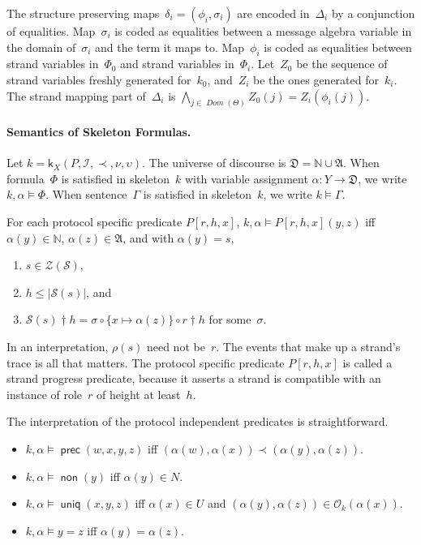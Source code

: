 \documentclass[12pt]{article}
\newcommand{\cn}[1]{\ensuremath{\operatorname{\mathsf{#1}}}}
\newcommand{\fn}[1]{\ensuremath{\operatorname{\mathit{#1}}}}
\newcommand{\sdom}{\fn{Dom}}
\newcommand{\prefix}[2]{#1\dagger#2}
\newcommand{\nat}{\ensuremath{\mathbb{N}}}
\newcommand{\alg}[1]{\ensuremath{\mathfrak{#1}}}
\newcommand{\msg}{\alg{A}}
\newcommand{\ssp}{\ensuremath{\mathcal{S}}}
\newcommand{\strands}{\ensuremath{\mathcal{Z}}}
\newcommand{\rl}{\ensuremath{\rho}}
\newcommand{\skel}{\mathsf{k}}
\newcommand{\insts}{\mathcal{I}}
\newcommand{\orig}{\mathcal{O}}
\begin{document}
The structure preserving maps~$\delta_i=(\phi_i,\sigma_i)$ are encoded
in~$\Delta_i$ by a conjunction of equalities.  Map~$\sigma_i$ is coded
as equalities between a message algebra variable in the domain
of~$\sigma_i$ and the term it maps to.  Map~$\phi_i$ is coded as
equalities between strand variables in~$\Phi_0$ and strand variables
in~$\Phi_i$.  Let~$Z_0$ be the sequence of strand variables freshly
generated for~$k_0$, and~$Z_i$ be the ones generated for~$k_i$.  The
strand mapping part of~$\Delta_i$ is
$\bigwedge_{j\in\sdom(\Theta)}Z_0(j)=Z_i(\phi_i(j))$.

\paragraph{Semantics of Skeleton Formulas.}

Let $k=\skel_X(P,\insts,\prec,\nu,\upsilon)$.  The universe of discourse is
$\alg{D}=\nat\cup\msg$.  When formula~$\Phi$ is satisfied in
skeleton~$k$ with variable assignment $\alpha\colon Y\to \alg{D}$, we
write $k,\alpha\models\Phi$.  When sentence~$\Gamma$ is satisfied in
skeleton~$k$, we write $k\models\Gamma$.

For each protocol specific predicate $P[r,h,x]$, $k,\alpha\models
P[r,h,x](y,z)$ iff $\alpha(y)\in\nat$, $\alpha(z)\in\msg$, and with
$\alpha(y)=s$,

\begin{enumerate}
\item $s\in\strands(\ssp)$,
\item $h\leq|\ssp(s)|$, and
\item $\prefix{\ssp(s)}{h}=\sigma\circ\{x\mapsto\alpha(z)\}\circ\prefix{r}{h}$
  for some~$\sigma$.
\end{enumerate}

In an interpretation, $\rl(s)$ need not be~$r$.  The events that make
up a strand's trace is all that matters.  The protocol specific
predicate $P[r,h,x]$ is called a strand progress predicate, because it
asserts a strand is compatible with an instance of role~$r$ of height
at least~$h$.

The interpretation of the protocol independent predicates is
straightforward.
\begin{itemize}
\item $k,\alpha\models\cn{prec}(w,x,y,z)$ iff
$(\alpha(w),\alpha(x))\prec(\alpha(y),\alpha(z))$.
\item $k,\alpha\models\cn{non}(y)$ iff $\alpha(y)\in N$.
\item $k,\alpha\models\cn{uniq}(x,y,z)$ iff $\alpha(x)\in U$ and
  $(\alpha(y),\alpha(z))\in\orig_k(\alpha(x))$.
\item $k,\alpha\models y=z$ iff $\alpha(y)=\alpha(z)$.
\end{itemize}
\end{document}
